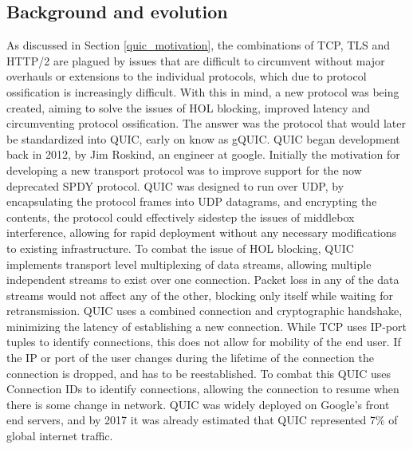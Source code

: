 \documentclass[english, 12pt, a4paper, elec, utf8, a-2b, online]{aaltothesis}
\begin{document}
\subsection{Background and evolution}
As discussed in Section \ref{quic_motivation}, the combinations of TCP, TLS and HTTP/2 are
plagued by issues that are difficult to circumvent without major overhauls or extensions to
the individual protocols, which due to protocol ossification is increasingly difficult. With
this in mind, a new protocol was being created, aiming to solve the issues of
HOL blocking, improved latency and circumventing protocol ossification. The answer
was the protocol that would later be standardized into QUIC, early on know as gQUIC.
QUIC began development back in 2012, by Jim Roskind, an engineer at google. Initially
the motivation for developing a new transport protocol was to improve support for
the now deprecated SPDY protocol\cite{googleQUICDesign}. QUIC was designed to run over
UDP, by encapsulating the protocol frames into UDP datagrams, and encrypting the contents,
the protocol could effectively sidestep the issues of middlebox interference, allowing
for rapid deployment without any necessary modifications to existing infrastructure.
To combat the issue of HOL blocking, QUIC implements transport level multiplexing of
data streams, allowing multiple independent streams to exist over one connection.
Packet loss in any of the data streams would not affect any of the other, blocking
only itself while waiting for retransmission. QUIC uses a combined connection and
cryptographic handshake, minimizing the latency of establishing a new connection.
While TCP uses IP-port tuples to identify connections, this does not allow for mobility
of the end user. If the IP or port of the user changes during the lifetime of the connection
the connection is dropped, and has to be reestablished. To combat this QUIC uses
Connection IDs to identify connections, allowing the connection to resume when
there is some change in network. QUIC was widely deployed on Google's front end servers,
and by 2017 it was already estimated that QUIC represented 7\% of global internet
traffic\cite{quic_transport_protocol_design}.
\end{document}
